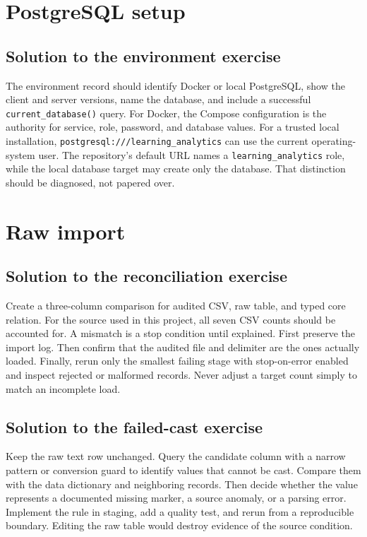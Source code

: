 \section{PostgreSQL setup}

\subsection{Solution to the environment exercise}
\label{sol:environment}

The environment record should identify Docker or local PostgreSQL, show the
client and server versions, name the database, and include a successful
\texttt{current\_database()} query. For Docker, the Compose configuration is
the authority for service, role, password, and database values. For a trusted
local installation, \texttt{postgresql:///learning\_analytics} can use the
current operating-system user. The repository's default URL names a
\texttt{learning\_analytics} role, while the local database target may create
only the database. That distinction should be diagnosed, not papered over.

\section{Raw import}

\subsection{Solution to the reconciliation exercise}
\label{sol:reconcile}

Create a three-column comparison for audited CSV, raw table, and typed core
relation. For the source used in this project, all seven CSV counts should be
accounted for. A mismatch is a stop condition until explained. First preserve
the import log. Then confirm that the audited file and delimiter are the ones
actually loaded. Finally, rerun only the smallest failing stage with
stop-on-error enabled and inspect rejected or malformed records. Never adjust a
target count simply to match an incomplete load.

\subsection{Solution to the failed-cast exercise}
\label{sol:failed-cast}

Keep the raw text row unchanged. Query the candidate column with a narrow
pattern or conversion guard to identify values that cannot be cast. Compare
them with the data dictionary and neighboring records. Then decide whether the
value represents a documented missing marker, a source anomaly, or a parsing
error. Implement the rule in staging, add a quality test, and rerun from a
reproducible boundary. Editing the raw table would destroy evidence of the
source condition.


